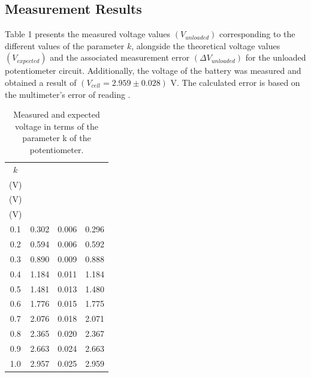 \documentclass[a4paper]{article}
\begin{document}
\subsection{Measurement Results}
Table 1 presents the measured voltage values $(V_{unloaded})$ corresponding to the different values of the parameter $k$, 
alongside the theoretical voltage values $(V_{expected})$ 
and the associated measurement error $(\Delta V_{unloaded})$ for the unloaded potentiometer circuit.
Additionally, the voltage of the battery was measured and obtained a result of $(V_{cell} = 2.959 \pm 0.028)$ V. 
The calculated error is based on the multimeter's error of reading \cite{noauthor_am-500_2019}.
\begin{table}[!ht]
    \centering
    \label{tab:1}
    \caption{Measured and expected voltage in terms of the parameter k of the potentiometer.}
    \begin{tabular}{|c c c c|} 
    \hline
    $k$ & \makecell{$V_{unloaded}$ \\ (V)} & \makecell{$\Delta V_{unloaded}$ \\ (V)} &
    \makecell{$V_{expected}$ \\ (V)}  \\ 
    \hline
    0.1                                       & 0.302      &  0.006          & 0.296      \\
    0.2                                       & 0.594      &  0.006          & 0.592      \\
    0.3                                       & 0.890      &  0.009          & 0.888      \\
    0.4                                       & 1.184      &  0.011          & 1.184      \\
    0.5                                       & 1.481      &  0.013          & 1.480      \\
    0.6                                       & 1.776      &  0.015          & 1.775      \\
    0.7                                       & 2.076      &  0.018          & 2.071      \\
    0.8                                       & 2.365      &  0.020          & 2.367      \\
    0.9                                       & 2.663      &  0.024          & 2.663      \\
    1.0                                       & 2.957      &  0.025          & 2.959      \\
    \hline
    \end{tabular}
    \end{table}
\newpage
\end{document}
